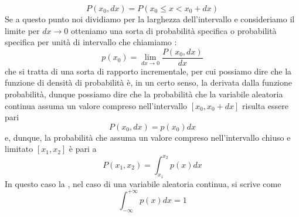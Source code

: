 \documentclass{report}
\begin{document}
$$
	P(x_0, dx) = P(x_0 \leq x < x_0 + dx)
$$
Se a questo punto noi dividiamo per la larghezza dell'intervallo e consideriamo il limite per $dx \to 0$ otteniamo una sorta di probabilità specifica o probabilità specifica per unità di intervallo che chiamiamo \emph{}:
\begin{equation}
	p(x_0) = \lim_{dx \to 0} \frac{P(x_0, dx)}{dx}
\end{equation}
che si tratta di una sorta di rapporto incrementale, per cui possiamo dire che la funzione di densità di probabilità è, in un certo senso, la derivata dalla funzione probabilità, dunque possiamo dire che la probabilità che la variabile aleatoria continua assuma un valore compreso nell'intervallo $[x_0, x_0 + dx]$ risulta essere pari
$$
	P(x_0, dx) = p(x_0)dx
$$
e, dunque, la probabilità che assuma un valore compreso nell'intervallo chiuso e limitato $[x_1, x_2]$ è pari a
\begin{equation}
	P(x_1, x_2) = \int_{x_1}^{x_2} p(x)dx
\end{equation}
In questo caso la , nel caso di una variabile aleatoria continua, si scrive come
\begin{equation}
	\int_{-\infty}^{+\infty} p(x)dx = 1
\end{equation}
\end{document}

